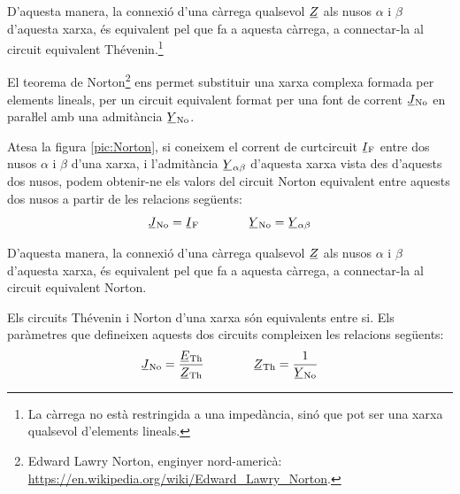 D'aquesta manera, la connexió d'una càrrega qualsevol $\cmplx{Z}$ als nusos $\alpha$ i $\beta$ d'aquesta xarxa, és
equivalent pel que fa a aquesta càrrega, a connectar-la al circuit
equivalent Thévenin.\footnote{\label{fn:Th-No}La càrrega no està restringida a una impedància, sinó que pot ser una xarxa qualsevol d'elements lineals.}
\begin{center}
    
    \label{pic:Thevenin}
\end{center}

El teorema de Norton\footnote{Edward Lawry Norton, enginyer nord-americà: \href{https://en.wikipedia.org/wiki/Edward_Lawry_Norton}{https:/\!\!/en.wikipedia.org/wiki/Edward\_Lawry\_Norton}.} ens permet substituir
una xarxa complexa formada per elements lineals, per un circuit
equivalent format per una font de corrent $\cmplx{J}\ped{No}$ en
paraŀlel amb una admitància $\cmplx{Y}\ped{No}$.

Atesa la figura \vref{pic:Norton}, si coneixem el corrent de
curtcircuit $\cmplx{I}\ped{F}$ entre dos nusos $\alpha$ i $\beta$
d'una xarxa, i l'admitància $\cmplx{Y}_{\alpha\beta}$ d'aquesta
xarxa vista des d'aquests dos nusos, podem obtenir-ne els valors del
circuit Norton equivalent entre aquests dos nusos a partir de les
relacions següents:
\begin{equation}
   \cmplx{J}\ped{No} = \cmplx{I}\ped{F} \qquad\qquad \cmplx{Y}\ped{No} = \cmplx{Y}_{\alpha\beta}
\end{equation}

D'aquesta manera, la connexió d'una càrrega qualsevol $\cmplx{Z}$ als nusos $\alpha$ i $\beta$ d'aquesta xarxa, és
equivalent pel que fa a aquesta càrrega, a connectar-la al circuit
equivalent Norton.
\begin{center}
    
    \label{pic:Norton}
\end{center}

Els circuits Thévenin i Norton d'una xarxa són equivalents entre si.
Els paràmetres que defineixen aquests dos circuits compleixen les relacions
següents:
\begin{equation}\label{eq:Thevenin-Norton}
     \cmplx{J}\ped{No} = \frac{\cmplx{E}\ped{Th}}{\cmplx{Z}\ped{Th}} \qquad\qquad
    \cmplx{Z}\ped{Th} = \frac{1}{\cmplx{Y}\ped{No}}
\end{equation}

